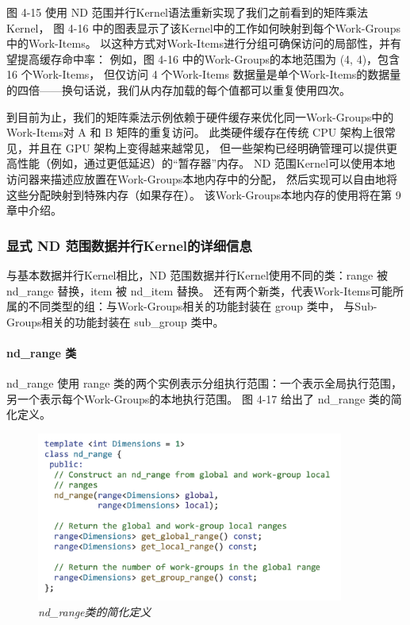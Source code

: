 图 4-15 使用 ND 范围并行Kernel语法重新实现了我们之前看到的矩阵乘法Kernel，
图 4-16 中的图表显示了该Kernel中的工作如何映射到每个Work-Groups中的Work-Items。 
以这种方式对Work-Items进行分组可确保访问的局部性，并有望提高缓存命中率：
例如，图 4-16 中的Work-Groups的本地范围为 (4, 4)，包含 16 个Work-Items，
但仅访问 4 个Work-Items 数据量是单个Work-Items的数据量的四倍——换句话说，我们从内存加载的每个值都可以重复使用四次。

到目前为止，我们的矩阵乘法示例依赖于硬件缓存来优化同一Work-Groups中的Work-Items对 A 和 B 矩阵的重复访问。 
此类硬件缓存在传统 CPU 架构上很常见，并且在 GPU 架构上变得越来越常见，
但一些架构已经明确管理可以提供更高性能（例如，通过更低延迟）的“暂存器”内存。 
ND 范围Kernel可以使用本地访问器来描述应放置在Work-Groups本地内存中的分配，
然后实现可以自由地将这些分配映射到特殊内存（如果存在）。 该Work-Groups本地内存的使用将在第 9 章中介绍。

\subsubsection{显式 ND 范围数据并行Kernel的详细信息}
与基本数据并行Kernel相比，ND 范围数据并行Kernel使用不同的类：range 被 nd\_range 替换，item 被 nd\_item 替换。 
还有两个新类，代表Work-Items可能所属的不同类型的组：与Work-Groups相关的功能封装在 group 类中，
与Sub-Groups相关的功能封装在 sub\_group 类中。

\paragraph{nd\_range 类}

nd\_range 使用 range 类的两个实例表示分组执行范围：一个表示全局执行范围，另一个表示每个Work-Groups的本地执行范围。 
图 4-17 给出了 nd\_range 类的简化定义。

\begin{figure}[H]
	\centering
	\includegraphics[width=0.9\textwidth]{figs/F4.17.png}
	\caption{\textit{nd\_range类的简化定义}}
\end{figure}

